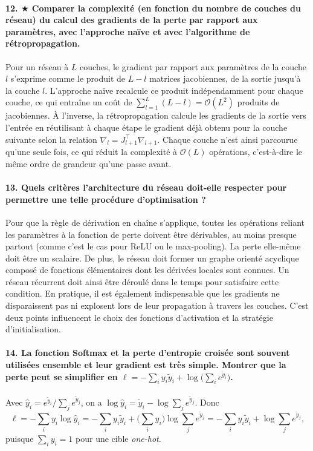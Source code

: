 \documentclass{report}
\begin{document}
\paragraph{12. $\bigstar$ Comparer la complexité (en fonction du nombre de couches du réseau) du calcul des gradients de la perte par rapport aux paramètres, avec l'approche naïve et avec l'algorithme de rétropropagation.}
Pour un réseau à $L$ couches, le gradient par rapport aux paramètres de la couche $l$ s'exprime comme le produit de $L - l$ matrices jacobiennes, de la sortie jusqu'à la couche $l$. L'approche naïve recalcule ce produit indépendamment pour chaque couche, ce qui entraîne un coût de $\sum_{l=1}^{L} (L - l) = \mathcal{O}(L^2)$ produits de jacobiennes. À l'inverse, la rétropropagation calcule les gradients de la sortie vers l'entrée en réutilisant à chaque étape le gradient déjà obtenu pour la couche suivante selon la relation $\nabla_{l} = J_{l+1}^\top \nabla_{l+1}$. Chaque couche n'est ainsi parcourue qu'une seule fois, ce qui réduit la complexité à $\mathcal{O}(L)$ opérations, c'est-à-dire le même ordre de grandeur qu'une passe avant.

\paragraph{13. Quels critères l'architecture du réseau doit-elle respecter pour permettre une telle procédure d'optimisation ?}
Pour que la règle de dérivation en chaîne s'applique, toutes les opérations reliant les paramètres à la fonction de perte doivent être dérivables, au moins presque partout (comme c'est le cas pour ReLU ou le max-pooling). La perte elle-même doit être un scalaire. De plus, le réseau doit former un graphe orienté acyclique composé de fonctions élémentaires dont les dérivées locales sont connues. Un réseau récurrent doit ainsi être déroulé dans le temps pour satisfaire cette condition. En pratique, il est également indispensable que les gradients ne disparaissent pas ni explosent lors de leur propagation à travers les couches. C'est deux points influencent le choix des fonctions d'activation et la stratégie d'initialisation.

\paragraph{14. La fonction Softmax et la perte d'entropie croisée sont souvent utilisées ensemble et leur gradient est très simple. Montrer que la perte peut se simplifier en $\ell = -\sum_i y_i \tilde{y}_i + \log \big(\sum_i e^{\tilde{y}_i}\big)$.}
Avec $\hat{y}_i = e^{\tilde{y}_i} / \sum_j e^{\tilde{y}_j}$, on a $\log \hat{y}_i = \tilde{y}_i - \log \sum_j e^{\tilde{y}_j}$. Donc
\begin{equation*}
    \ell = -\sum_i y_i \log \hat{y}_i = -\sum_i y_i \tilde{y}_i + \Big(\sum_i y_i\Big) \log \sum_j e^{\tilde{y}_j} = -\sum_i y_i \tilde{y}_i + \log \sum_j e^{\tilde{y}_j},
\end{equation*}
puisque $\sum_i y_i = 1$ pour une cible \textit{one-hot}.
\end{document}
